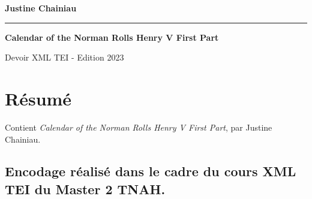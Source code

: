 \documentclass[a4paper,12pt,twoside]{book}
\begin{document}
	\begin{titlepage}
		\begin{center}
			
			
			\bigskip
			\bigskip
			\bigskip
			\begin{Large}
				\textbf{Justine Chainiau}\\
			\end{Large}
			
			\bigskip
			\bigskip
			\bigskip
			\begin{center}\rule{2cm}{0.02cm}\end{center}
			\bigskip
			\bigskip
			\bigskip
			
			\begin{Huge}
				\textbf{Calendar of the Norman Rolls 
               Henry V  First Part}\\
			\end{Huge}
			\bigskip
			\bigskip
			
			
			\bigskip
			\bigskip
			\bigskip
			\begin{large}
			\end{large}
			\vfill
			
			\begin{large}
               Devoir XML TEI - Edition 
            2023\end{large}
			
		\end{center}
	\end{titlepage}
	\newpage
        
    
    \tableofcontents   
    
	\chapter{Résumé}
	\medskip
        
     Contient \textit{Calendar of the Norman Rolls 
               Henry V  First Part}, par Justine Chainiau.
        
    \bigskip
        
    \begin{Large} 
        \section{Encodage réalisé dans le cadre du cours XML TEI du Master 2 TNAH. }
    \end{Large}
        
    \medskip
        
\end{document}
